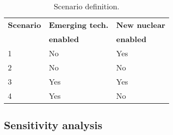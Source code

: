 \begin{table}[!ht]
	\caption{Scenario definition.}
	\vspace{0.1in}
	\begin{tabularx}{\textwidth}{p{} p{} p{}}
\hline 
\textbf{Scenario}& \textbf{Emerging tech.} & \textbf{New nuclear} \\
                 & \textbf{enabled} & \textbf{enabled} \\
                  \hline
1               &   No       &      Yes     \\ 
2               &  No       &         No       \\ 
3               &   Yes     &      Yes     \\ 
4               &   Yes     &         No       \\

\hline
	\end{tabularx}
\label{scen-table}
\end{table}



\subsection{Sensitivity analysis}

